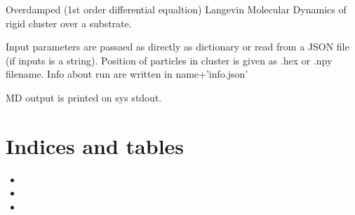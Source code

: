 \documentclass[letterpaper,10pt,english]{sphinxmanual}
\begin{document}
\begin{fulllineitems}
\label{\detokenize{md_rigid_rototrasl:MD_rigid_rototrasl.MD_rigid}}
\pysigstartsignatures
{}
\pysigstopsignatures
\sphinxAtStartPar
Overdamped (1st order differential equaltion) Langevin Molecular Dynamics of rigid cluster over a substrate.

\sphinxAtStartPar
Input parameters are passaed as directly as dictionary or read from a JSON file (if inputs is a string).
Position of particles in cluster is given as .hex or .npy filename.
Info about run are written in name+’info.json’

\sphinxAtStartPar
MD output is printed on sys stdout.

\end{fulllineitems}



\chapter{Indices and tables}
\label{\detokenize{index:indices-and-tables}}\begin{itemize}
\item {} 
\sphinxAtStartPar
{}

\item {} 
\sphinxAtStartPar
{}

\item {} 
\sphinxAtStartPar
{}

\end{itemize}
\end{document}
